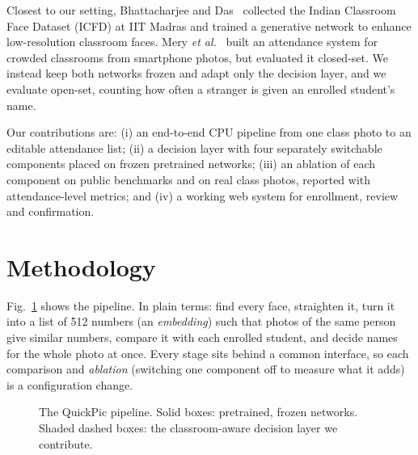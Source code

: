 \documentclass[conference,a4paper]{IEEEtran}
\begin{document}
Closest to our setting, Bhattacharjee and Das~\cite{icfd} collected the Indian Classroom Face Dataset (ICFD) at IIT Madras and trained a generative network to enhance low-resolution classroom faces. Mery \emph{et al.}~\cite{mery} built an attendance system for crowded classrooms from smartphone photos, but evaluated it closed-set. We instead keep both networks frozen and adapt only the decision layer, and we evaluate open-set, counting how often a stranger is given an enrolled student's name.

Our contributions are: (i) an end-to-end CPU pipeline from one class photo to an editable attendance list; (ii) a decision layer with four separately switchable components placed on frozen pretrained networks; (iii) an ablation of each component on public benchmarks and on real class photos, reported with attendance-level metrics; and (iv) a working web system for enrollment, review and confirmation.

\section{Methodology}

Fig.~\ref{fig:pipeline} shows the pipeline. In plain terms: find every face, straighten it, turn it into a list of 512 numbers (an \emph{embedding}) such that photos of the same person give similar numbers, compare it with each enrolled student, and decide names for the whole photo at once. Every stage sits behind a common interface, so each comparison and \emph{ablation} (switching one component off to measure what it adds) is a configuration change.

\begin{figure}[t]
\centering
{}
\caption{The QuickPic pipeline. Solid boxes: pretrained, frozen networks. Shaded dashed boxes: the classroom-aware decision layer we contribute.}
\label{fig:pipeline}
\end{figure}
\end{document}
